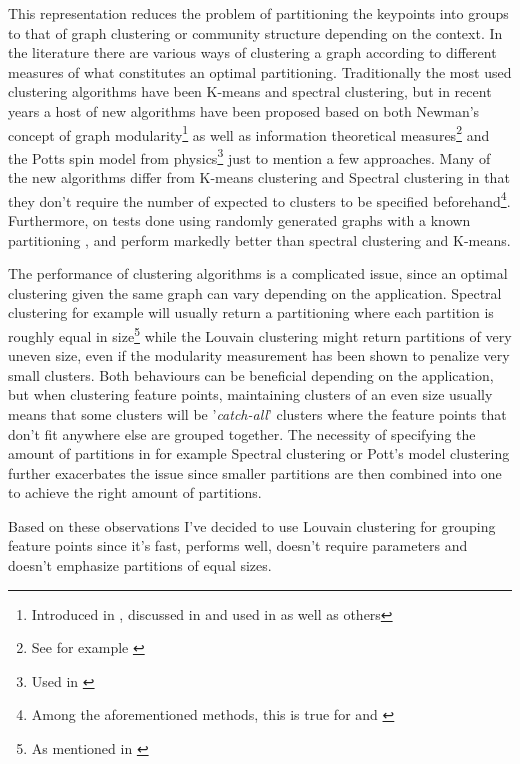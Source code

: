 \documentclass{article}
\begin{document}
This representation reduces the problem of partitioning the keypoints 
into groups to that of graph clustering or community structure depending 
on the context. In the literature there are various ways of clustering a 
graph according to different measures of what constitutes an optimal 
partitioning. Traditionally the most used clustering algorithms have 
been K-means and spectral clustering, but in recent years a host of new 
algorithms have been proposed based on both Newman's concept of graph 
modularity\footnote{Introduced in \cite{girvan2002}, discussed in 
\cite{brandes2007} and used in \cite{blondel2008} as well as others} as 
well as information theoretical measures\footnote{See for example 
\cite{rosvall2008}} and the Potts spin model from physics\footnote{Used 
in \cite{ronhovde2009}} just to mention a few approaches. Many of the 
new algorithms differ from K-means clustering and Spectral clustering in 
that they don't require the number of expected to clusters to be 
specified beforehand\footnote{Among the aforementioned methods, this is 
true for \cite{blondel2008} and \cite{rosvall2008}}.  Furthermore, on 
tests done using randomly generated graphs with a known partitioning 
\cite{blondel2008}, \cite{rosvall2008} and \cite{ronhovde2009} perform 
markedly better than spectral clustering and 
K-means\cite{lancichinetti2009}.

The performance of clustering algorithms is a complicated issue, since 
an optimal clustering given the same graph can vary depending on the 
application. Spectral clustering for example will usually return a 
partitioning where each partition is roughly equal in size\footnote{As 
mentioned in \cite{von2007}} while the Louvain 
clustering\cite{blondel2008} might return partitions of very uneven 
size, even if the modularity measurement has been shown to penalize very 
small clusters\cite{brandes2007}. Both behaviours can be beneficial 
depending on the application, but when clustering feature points, 
maintaining clusters of an even size usually means that some clusters 
will be '\emph{catch-all}' clusters where the feature points that don't 
fit anywhere else are grouped together. The necessity of specifying the 
amount of partitions in for example Spectral clustering or Pott's model 
clustering further exacerbates the issue since smaller partitions are 
then combined into one to achieve the right amount of partitions.

Based on these observations I've decided to use Louvain clustering for 
grouping feature points since it's fast, performs well, doesn't require 
parameters and doesn't emphasize partitions of equal sizes.
\end{document}
